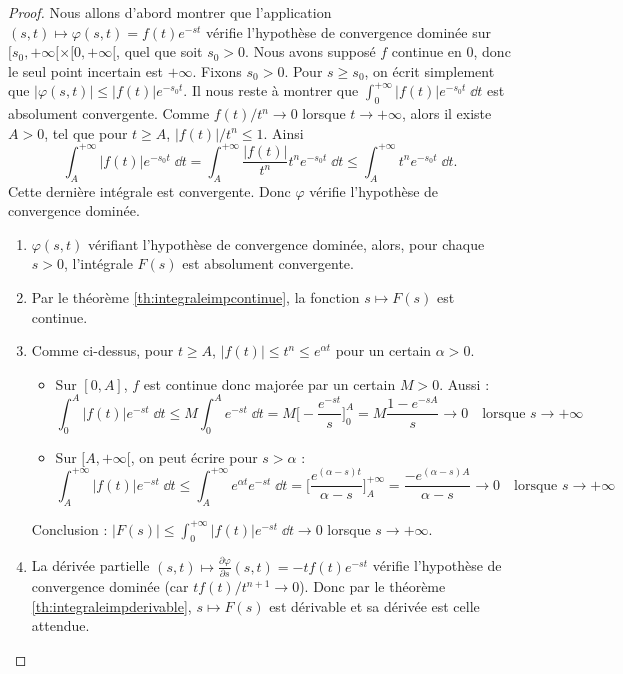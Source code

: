 \documentclass[class=report,crop=false]{standalone}
\begin{document}
\begin{proof}
Nous allons d'abord montrer que l'application 
$(s,t) \mapsto \varphi(s,t) = f(t) e^{-st}$ vérifie l'hypothèse de 
convergence dominée sur $[s_0,+\infty[\times [0,+\infty[$, quel que soit $s_0>0$. 
Nous avons supposé $f$ continue en $0$, donc 
le seul point incertain est $+\infty$. 
Fixons $s_0>0$. Pour $s \ge s_0$, on écrit simplement que 
$|\varphi(s,t)| \le |f(t)| e^{-s_0t}$.
Il nous reste à montrer que $\int_0^{+\infty} |f(t)|e^{-s_0t}\;\dd t$ est absolument
convergente. Comme $f(t)/t^n \to 0$ lorsque $t\to+\infty$, alors il existe
$A>0$, tel que pour $t \ge A$, $|f(t)|/t^n \le 1$. Ainsi
$$\int_A^{+\infty} |f(t)|e^{-s_0t}\;\dd t 
= \int_A^{+\infty} \frac{|f(t)|}{t^n} t^n e^{-s_0t}\;\dd t 
\le \int_A^{+\infty} t^n e^{-s_0t}\;\dd t.$$
Cette dernière intégrale est convergente. Donc $\varphi$ 
vérifie l'hypothèse de convergence dominée.

\begin{enumerate}
  \item $\varphi(s,t)$ vérifiant l'hypothèse de convergence dominée, alors,
  pour chaque $s>0$, l'intégrale $F(s)$ est absolument convergente.
  
  \item Par le théorème \ref{th:integraleimpcontinue}, la fonction $s \mapsto F(s)$ est continue.
  
  \item Comme ci-dessus, pour $t\ge A$,
  $|f(t)| \le t^n \le e^{\alpha t}$ pour un certain $\alpha > 0$.
  \begin{itemize}
    \item Sur $[0,A]$, $f$ est continue donc majorée par un certain $M>0$.
    Aussi :
    $$\int_0^A |f(t)|e^{-st}\;\dd t \le M\int_0^A e^{-st}\;\dd t
    = M\Big[ -\frac{e^{-st}}{s} \Big]_0^A = M\frac{1-e^{-sA}}{s} \to 0 \quad \text{lorsque } s \to +\infty$$
    
    \item Sur $[A,+\infty[$, on peut écrire pour $s>\alpha$ :
    $$\int_A^{+\infty} |f(t)|e^{-st}\;\dd t \le \int_A^{+\infty} e^{\alpha t}e^{-st}\;\dd t
    = \Big[ \frac{e^{(\alpha-s)t}}{\alpha-s} \Big]_A^{+\infty} = \frac{-e^{(\alpha-s)A}}{\alpha-s} \to 0\quad \text{lorsque } s \to +\infty$$
  \end{itemize}

 Conclusion : $\big| F(s) \big| \le \int_0^{+\infty} \big|f(t)\big|e^{-st}\;\dd t \to 0$ lorsque $s\to+\infty$.
  
  \item La dérivée partielle 
  $(s,t) \longmapsto \frac{\partial \varphi}{\partial s}(s,t) = -tf(t) e^{-st}$
  vérifie l'hypothèse de convergence dominée (car $tf(t)/t^{n+1} \to 0$).
  Donc par le théorème \ref{th:integraleimpderivable}, $s \mapsto F(s)$ est dérivable
  et sa dérivée est celle attendue.
\end{enumerate}
\end{proof}
\end{document}
